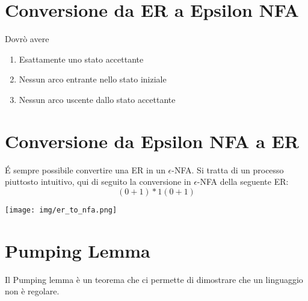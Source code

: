 \section{Conversione da ER a Epsilon NFA}
Dovrò avere
\begin{enumerate}
    \item Esattamente uno stato accettante
    \item Nessun arco entrante nello stato iniziale
    \item Nessun arco uscente dallo stato accettante
\end{enumerate}
\section{Conversione da Epsilon NFA a ER}
\'E sempre possibile convertire una ER in un $\epsilon$-NFA.
Si tratta di un processo piuttosto intuitivo, qui di seguito la conversione in
$\epsilon$-NFA della seguente ER:
\begin{equation*}
    (0 + 1)* 1(0 + 1) 
\end{equation*}
\begin{center}
    \texttt{[image: img/er\_to\_nfa.png]}
\end{center}
\section{Pumping Lemma}
Il Pumping lemma è un teorema che ci permette di dimostrare che un linguaggio non è regolare.
